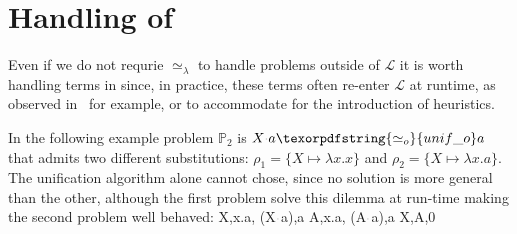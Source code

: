 \documentclass[sigconf,natbib=false,review]{acmart}
\newcommand{\appsep}{\ensuremath{\textcolor{lightgray}{\cdot}}}
\newcommand{\UnifRel}{\ensuremath{\simeq}}
\newcommand{\nUnifRel}{\ensuremath{\not\simeq}}
\newcommand{\Uo}{\texorpdfstring{\ensuremath{\UnifRel_o}\xspace}{unif\_o}}
\newcommand{\nUo}{\ensuremath{\nUnifRel_o}\xspace}
\newcommand{\Ue}{\ensuremath{\UnifRel_\lambda}\xspace}
\newcommand{\llambda}{\ensuremath{\mathcal{L}}\xspace}
\newcommand{\foUnifPb}{\ensuremath{\mathbb{P}}\xspace}
\begin{document}
\section{Handling of \notllambda}\label{sec:beta}

Even if we do not requrie \Ue to handle problems outside of \llambda it is
worth handling terms in \notllambda since, in practice, these terms often
re-enter \llambda at runtime, as observed in~\cite{Nadathur2001} for example,
or to accommodate for the introduction of heuristics.

In the following example problem $\foUnifPb_2$ is $X \appsep a \Uo a$  that
admits two different substitutions: $\rho_1 = \{X \mapsto \lambda x.x\}$
and $\rho_2 = \{X \mapsto \lambda x.a\}$. The unification algorithm alone
cannot chose, since no solution is more general than the other,
although the first problem solve this dilemma at run-time making the second
problem well behaved:
%
\printAlll
  {{{X,\lambda x.a},
    {(X\appsep a),a}}}
  {{{A,\lambda x.a},
    {(A\appsep a),a}}}
  {{{X,A,0}}}
  {{}}



\end{document}
